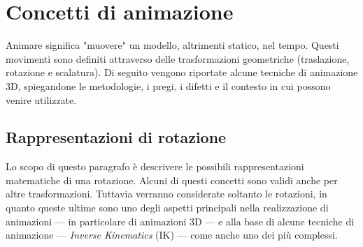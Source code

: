 
\makeatletter
\newlength\xvec@height%
\newlength\xvec@depth%
\newlength\xvec@width%
\newcommand{\xvec}[2][]{%
  \ifmmode%
    \settoheight{\xvec@height}{$#2$}%
    \settodepth{\xvec@depth}{$#2$}%
    \settowidth{\xvec@width}{$#2$}%
  \else%
    \settoheight{\xvec@height}{#2}%
    \settodepth{\xvec@depth}{#2}%
    \settowidth{\xvec@width}{#2}%
  \fi%
  \def\xvec@arg{#1}%
  \def\xvec@dd{:}%
  \def\xvec@d{.}%
  \raisebox{.2ex}{\raisebox{\xvec@height}{\rlap{%
    \kern.05em%
    \begin{tikzpicture}[scale=1]
    \pgfsetroundcap
    \draw (.05em,0)--(\xvec@width-.05em,0);
    \draw (\xvec@width-.05em,0)--(\xvec@width-.15em, .075em);
    \draw (\xvec@width-.05em,0)--(\xvec@width-.15em,-.075em);
    \ifx\xvec@arg\xvec@d%
      \fill(\xvec@width*.45,.5ex) circle (.5pt);%
    \else\ifx\xvec@arg\xvec@dd%
      \fill(\xvec@width*.30,.5ex) circle (.5pt);%
      \fill(\xvec@width*.65,.5ex) circle (.5pt);%
    \fi\fi%
    \end{tikzpicture}%
  }}}%
  #2%
}
\makeatother

\let\stdvec\vec
\renewcommand{\vec}[1]{\xvec[]{#1}}
\newcommand{\dvec}[1]{\xvec[.]{#1}}
\newcommand{\ddvec}[1]{\xvec[:]{#1}}

\chapter{Concetti di animazione} 

\label{Chapter3} %

Animare significa "muovere" un modello, altrimenti statico, nel tempo. Questi movimenti sono definiti attraverso delle trasformazioni geometriche (traslazione, rotazione e scalatura).
Di seguito vengono riportate alcune tecniche di animazione 3D, spiegandone le metodologie, i pregi, i difetti e il contesto in cui possono venire utilizzate. 


\section{Rappresentazioni di rotazione}\label{Section3.1}
Lo scopo di questo paragrafo è descrivere le possibili rappresentazioni matematiche di una rotazione.
Alcuni di questi concetti sono validi anche per altre trasformazioni.
Tuttavia verranno considerate soltanto le rotazioni, in quanto queste ultime sono uno degli aspetti principali nella realizzazione di animazioni --- in particolare di animazioni 3D --- e alla base di alcune tecniche di animazione --- \emph{Inverse Kinematics} (IK) --- come anche uno dei più complessi. 

